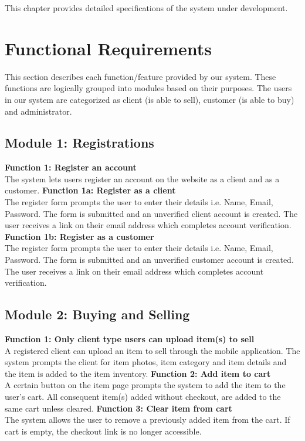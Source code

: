 This chapter provides detailed specifications of the system under development.

\section{Functional Requirements}

This section describes each function/feature provided by our system. These functions are logically grouped into modules based on their purposes. The users in our system are categorized as client (is able to sell), customer (is able to buy) and administrator.

\subsection*{Module 1: Registrations}
\begin{outline}
    \1 \textbf{Function 1: Register an account} \\
    The system lets users register an account on the website as a client and as a customer.
        \2 \textbf{Function 1a: Register as a client} \\
        The register form prompts the user to enter their details i.e. Name, Email, Password. The form is submitted and an unverified client account is created. The user receives a link on their email address which completes account verification.
        \2 \textbf{Function 1b: Register as a customer} \\
        The register form prompts the user to enter their details i.e. Name, Email, Password. The form is submitted and an unverified customer account is created. The user receives a link on their email address which completes account verification.
\end{outline}

\subsection*{Module 2: Buying and Selling}
\begin{outline}
    \1 \textbf{Function 1: Only client type users can upload item(s) to sell} \\
    A registered client can upload an item to sell through the mobile application. The system prompts the client for item photos, item category and item details and the item is added to the item inventory.
    \1 \textbf{Function 2: Add item to cart} \\
    A certain button on the item page prompts the system to add the item to the user's cart. All consequent item(s) added without checkout, are added to the same cart unless cleared.
    \1 \textbf{Function 3: Clear item from cart} \\
    The system allows the user to remove a previously added item from the cart. If cart is empty, the checkout link is no longer accessible.
\end{outline}

